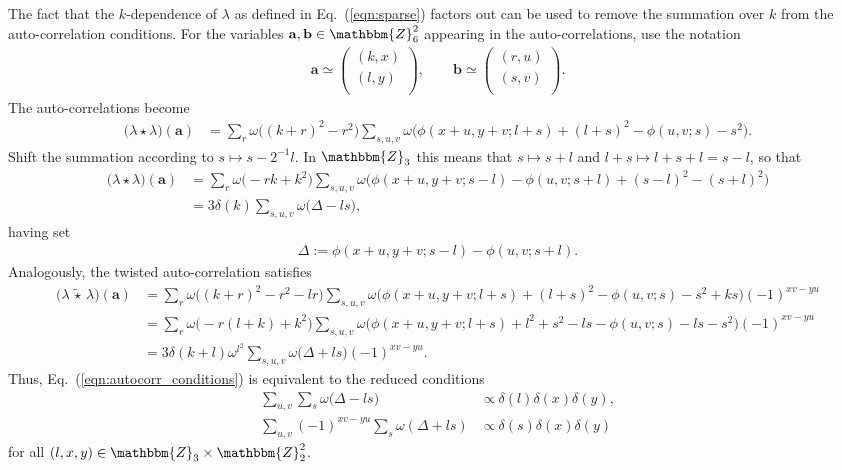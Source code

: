 \documentclass[aps,nofootinbib,floatfix,a4paper]{revtex4}
\newcommand{\1}{\mbox{$\mathbf{1}$}}
\def\ZZ{\mathbbm{Z}}
\newcommand{\twisted}{\,\tilde\star\,}
\renewcommand{\vec}{\mathbf}
\begin{document}
The fact that the $k$-dependence of $\lambda$ as defined in Eq.~(\ref{eqn:sparse}) factors out can be used to remove the summation over $k$ from the auto-correlation conditions.
For the variables $\vec a, \vec b\in\ZZ_6^2$ appearing in the auto-correlations, use the notation
\begin{align*}
	\vec a 
	\simeq
	\begin{pmatrix}
		(k,x)\\
		(l,y)\\
	\end{pmatrix},
	\qquad
	\vec b 
	\simeq
	\begin{pmatrix}
		(r,u)\\
		(s,v)\\
	\end{pmatrix}.
\end{align*}
The auto-correlations become 
\begin{align*}
	\big(\lambda \star \lambda\big)(\vec a)
	&=
	\sum_{r} 
	\omega\big((k+r)^2-r^2\big)
	\sum_{s,u,v}
	\omega\big( \phi(x+u,y+v; l+s)+(l+s)^2-\phi(u,v;s)-s^2 \big)  .
\end{align*}
Shift the summation according to $s \mapsto s-2^{-1} l$.
In $\ZZ_3$ this means that $s\mapsto s+l$ and 
$l+s \mapsto l+s+l=s-l$, so that
\begin{align*}
	\big(\lambda \star \lambda\big)(\vec a)
	&=
	\sum_{r} 
	\omega\big(-rk+k^2\big)
	\sum_{s,u,v}
	\omega\big( 
		\phi(x+u,y+v; s-l)-\phi(u,v;s+l) + (s-l)^2 - (s+l)^2
	\big)  
	\\
	&=
	3
	\delta(k)
	\sum_{s,u,v}
	\omega\big( 
		\Delta
		-ls
	\big),
\end{align*}
having set
\begin{align}\label{eqn:Delta}
	\Delta
	:=
	\phi(x+u, y+v;s-l)-\phi(u,v;s+l).
\end{align}
Analogously, the twisted auto-correlation satisfies
\begin{align*}
	\big(\lambda \twisted \lambda\big) (\vec a)
	&=
	\sum_{r} 
	\omega\big((k+r)^2-r^2 - lr \big)
	\sum_{s,u,v}
	\omega\big(\phi(x+u,y+v;l+s)+(l+s)^2-\phi(u,v;s)-s^2+ks\big) 
	(-1)^{xv-yu} \\
	&= %
	\sum_{r} 
	\omega\big(-r(l +k) + k^2  \big) 
	\sum_{s,u,v}
	\omega\big(\phi(x+u,y+v;l+s)+l^2 + s^2 - ls-\phi(u,v;s)-ls-s^2\big) 
	(-1)^{xv-yu} \\
	&=
	3\delta(k+l)
	\omega^{l^2}
	\sum_{s,u,v}
	\omega\big(\Delta+ls\big) 
	(-1)^{xv-yu} .
\end{align*}
Thus, Eq.~(\ref{eqn:autocorr_conditions}) is equivalent to the reduced conditions
\begin{align}
		\sum_{u,v}
		\sum_s
		\omega\big(\Delta-ls\big)
		&\propto \delta(l)\delta(x)\delta(y), 
		\label{eqn:reduced_proper_cond} 
		\\
		\sum_{u,v}
		(-1)^{xv-yu} 
		\sum_s
		\omega(\Delta+ls)
		&\propto \delta(s)\delta(x)\delta(y)
		\label{eqn:reduced_twisted_cond}
\end{align}
for all $(l,x,y)\in\ZZ_3\times \ZZ_2^2$.
\end{document}
